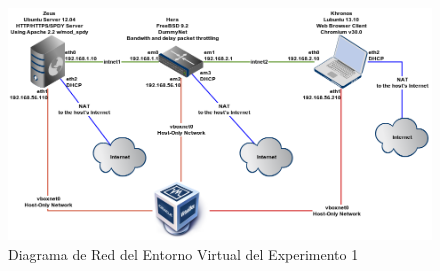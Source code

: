 \documentclass[a4paper,11pt,twocolumn]{article}
\begin{document}
\begin{figure}[ht]
  \centering\includegraphics[scale=0.5]{diagramavms}
  \caption{Diagrama de Red del Entorno Virtual del Experimento 1}
  \label{diagramavms}
\end{figure}
\end{document}
